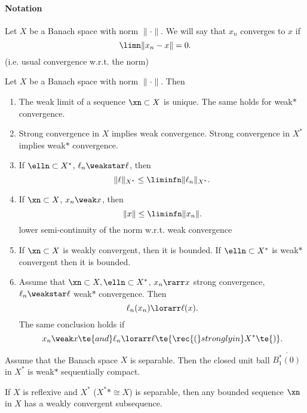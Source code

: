 \paragraph{Notation}
Let $X$ be a Banach space with norm $\|\cdot\|$. We will say that $x_n$ converges  to $x$ if 
\[\limn\|x_n-x\|=0.\]
(i.e. usual convergence w.r.t. the norm)

\begin{lem}\label{vii.3}
    Let $X$ be a Banach space with norm $\|\cdot\|$. Then
    \begin{enumerate}[label=\alph*)]
        \item \label{vii.3.a}The weak limit of a sequence $\xn\subset X$ is unique. The same holds for weak$\ast$ convergence.
        \item \label{vii.3.b}Strong convergence in $X$ implies weak convergence. Strong convergence in $X^*$ implies weak$\ast$ convergence.
        \item \label{vii.3.c}If $\elln\subset X^*$, $\ell_n\weakstar \ell$, then
        \[\|\ell\|_{X^*}\leq\liminfn\|\ell_n\|_{X^*}.\]
        \item \label{vii.3.d}If $\xn\subset X$, $x_n\weak x$, then 
        \[\|x\|\leq\liminfn\|x_n\|.\]
        \rec{(}lower semi-continuity of the norm w.r.t. weak convergence\rec{)}
        \item \label{vii.3.e}If $\xn\subset X$ is weakly convergent, then it is bounded. If $\elln\subset X^*$ is weak$\ast$ convergent then it is bounded.
        \item \label{vii.3.f}Assume that $\xn\subset X,\elln\subset X^*$, $x_n\rarr x$ \rec{(}strong convergence\rec{)}, $\ell_n\weakstar\ell$ \rec{(}weak$\ast$ convergence\rec{)}. Then
        \[\ell_n(x_n)\lorarr\ell(x).\]
        The same conclusion holds if
        \[x_n\weak x\te{ and }\ell_n\lorarr\ell\te{ \rec{(}strongly in }X^*\te{)}.\]
    \end{enumerate}
\end{lem}

\begin{thm}\label{vii.4}
    Assume that the Banach space $X$ is separable. Then the closed unit ball $\overline{B_1^*(0)}$ in $X^*$ is weak$\ast$ sequentially compact.
\end{thm}

\begin{cor}\label{vii.5}
    If $X$ is reflexive and $X^*$ (\(X^** \cong X\)) is separable, 
    then any bounded sequence $\xn$ in $X$ has a weakly convergent subsequence.
\end{cor}